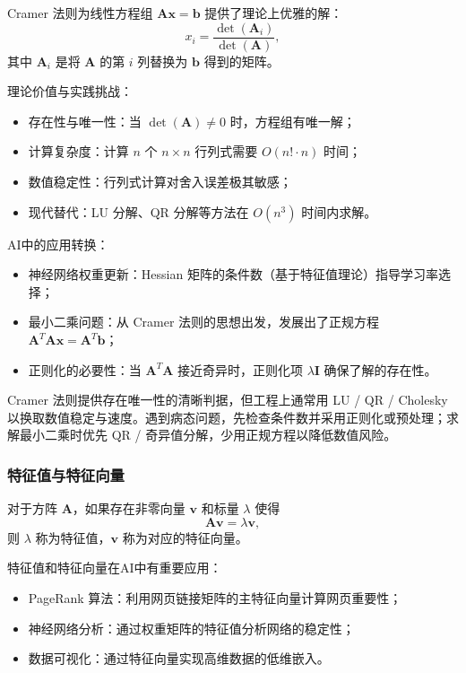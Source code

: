 Cramer 法则为线性方程组 $\mathbf{A}\mathbf{x} = \mathbf{b}$ 提供了理论上优雅的解：
$$
x_i = \frac{\det(\mathbf{A}_i)}{\det(\mathbf{A})},
$$
其中 $\mathbf{A}_i$ 是将 $\mathbf{A}$ 的第 $i$ 列替换为 $\mathbf{b}$ 得到的矩阵。

理论价值与实践挑战：
\begin{itemize}
  \item 存在性与唯一性：当 $\det(\mathbf{A}) \neq 0$ 时，方程组有唯一解；
  \item 计算复杂度：计算 $n$ 个 $n \times n$ 行列式需要 $O(n! \cdot n)$ 时间；
  \item 数值稳定性：行列式计算对舍入误差极其敏感；
  \item 现代替代：LU 分解、QR 分解等方法在 $O(n^3)$ 时间内求解。
\end{itemize}

AI中的应用转换：
\begin{itemize}
  \item 神经网络权重更新：Hessian 矩阵的条件数（基于特征值理论）指导学习率选择；
  \item 最小二乘问题：从 Cramer 法则的思想出发，发展出了正规方程 $\mathbf{A}^T\mathbf{A}\mathbf{x} = \mathbf{A}^T\mathbf{b}$；
  \item 正则化的必要性：当 $\mathbf{A}^T\mathbf{A}$ 接近奇异时，正则化项 $\lambda\mathbf{I}$ 确保了解的存在性。
\end{itemize}

Cramer 法则提供存在唯一性的清晰判据，但工程上通常用 LU / QR / Cholesky 以换取数值稳定与速度。遇到病态问题，先检查条件数并采用正则化或预处理；求解最小二乘时优先 QR / 奇异值分解，少用正规方程以降低数值风险。

\subsubsection{特征值与特征向量}

对于方阵 $\mathbf{A}$，如果存在非零向量 $\mathbf{v}$ 和标量 $\lambda$ 使得
$$
\mathbf{A}\mathbf{v} = \lambda\mathbf{v},
$$
则 $\lambda$ 称为特征值，$\mathbf{v}$ 称为对应的特征向量。

特征值和特征向量在AI中有重要应用：
\begin{itemize}
  \item PageRank 算法：利用网页链接矩阵的主特征向量计算网页重要性；
  \item 神经网络分析：通过权重矩阵的特征值分析网络的稳定性；
  \item 数据可视化：通过特征向量实现高维数据的低维嵌入。
\end{itemize}

